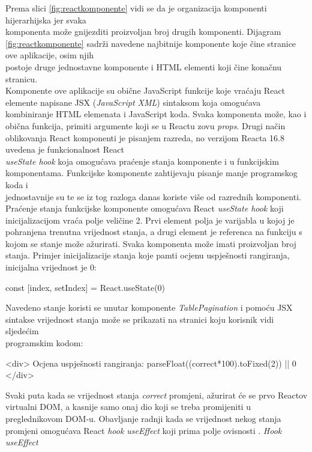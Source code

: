 \documentclass[times, utf8, zavrsni]{fer}
\begin{document}
            \FloatBarrier
Prema slici \ref{fig:reactkomponente} vidi se da je organizacija komponenti hijerarhijska jer svaka \\komponenta može gnijezditi proizvoljan broj drugih komponenti.
Dijagram \ref{fig:reactkomponente} sadrži navedene najbitnije komponente koje čine stranice ove aplikacije, osim njih \\postoje druge jednostavne komponente i HTML elementi 
koji čine konačnu stranicu. \\Komponente ove aplikacije su obične JavaScript funkcije koje vraćaju React elemente napisane JSX (\emph{JavaScript XML}) sintaksom koja 
omogućava kombiniranje HTML elemenata i JavaScript koda. Svaka komponenta može, kao i obična funkcija, primiti argumente koji se u Reactu zovu \emph{props}.
Drugi način oblikovanja React komponenti je pisanjem razreda, no verzijom Reacta 16.8 uvedena je funkcionalnost React \\\emph{useState hook} koja omogućava 
praćenje stanja komponente i u funkcijskim komponentama. Funkcijske komponente zahtijevaju pisanje manje programskog koda i \\jednostavnije su te se iz tog
razloga danas koriste više od razrednih komponenti. 
Praćenje stanja funkcijske komponente omogućava React \emph{useState hook} koji \\inicijalizacijom vraća polje veličine 2. Prvi element polja je varijabla u kojoj 
je pohranjena trenutna vrijednost stanja, a drugi element je referenca na funkciju s kojom se stanje može ažurirati. Svaka komponenta može imati 
proizvoljan broj stanja. Primjer inicijalizacije stanja koje pamti ocjenu uspješnosti rangiranja, inicijalna vrijednost je 0:
\begin{verbnobox}[\fontsize{10pt}{10pt}\selectfont]
const [index, setIndex] = React.useState(0)
\end{verbnobox}
Navedeno stanje koristi se unutar komponente \emph{TablePagination} i pomoću JSX sintakse vrijednost stanja može se prikazati na stranici koju korisnik vidi sljedećim \\programskim kodom:
\begin{verbnobox}[\fontsize{10pt}{10pt}\selectfont]
<div>
    Ocjena uspješnosti rangiranja: 
        {parseFloat((correct*100).toFixed(2)) || 0}
</div>
\end{verbnobox}
Svaki puta kada se vrijednost stanja \emph{correct} promjeni, ažurirat će se prvo Reactov virtualni DOM, a kasnije samo onaj dio koji se treba promijeniti u preglednikovom DOM-u.
Obavljanje radnji kada se vrijednost nekog stanja promjeni omogućava React \emph{hook useEffect} koji prima polje ovisnosti . \emph{Hook useEffect}
\end{document}

